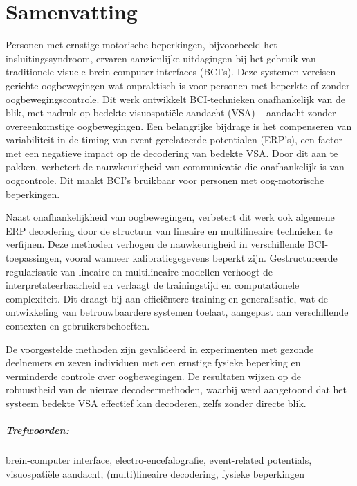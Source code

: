 \chapter*{Samenvatting}

Personen met ernstige motorische beperkingen, bijvoorbeeld het
insluitings\-syndroom, ervaren aanzienlijke uitdagingen bij het gebruik van
traditionele visuele brein-computer interfaces (BCI's).
Deze systemen vereisen gerichte oogbewegingen wat onpraktisch is voor personen
met beperkte of zonder oogbewegingscontrole.
Dit werk ontwikkelt BCI-technieken onafhankelijk van de blik, met nadruk
op bedekte visuospati\"ele aandacht (VSA) -- aandacht zonder overeenkomstige oogbewegingen.
Een belangrijke bijdrage is het compenseren van variabiliteit in de
timing van event-gerelateerde potentialen (ERP's), een factor met een negatieve
impact op de decodering van bedekte VSA.
Door dit aan te pakken, verbetert de nauwkeurigheid van communicatie die
onafhankelijk is van oogcontrole.
Dit maakt BCI's bruikbaar voor personen met oog-motorische beperkingen.

Naast onafhankelijkheid van oogbewegingen, verbetert dit werk ook algemene
ERP decodering door de structuur van lineaire en multilineaire technieken te verfijnen.
Deze methoden verhogen de nauwkeurigheid in verschillende BCI-toepassingen,
vooral wanneer kalibratiegegevens beperkt zijn.
Ge\-struc\-tu\-reerde regularisatie van lineaire en
multilineaire modellen verhoogt de interpretateerbaarheid
en verlaagt de trainingstijd en computationele complexiteit.
Dit draagt bij aan efficiëntere training en generalisatie, wat
de ont\-wik\-ke\-ling van betrouwbaardere systemen toelaat, aangepast aan
verschillende contexten en gebruikersbehoeften.

De voorgestelde methoden zijn gevalideerd in experimenten met gezonde
deelnemers en zeven individuen met een ernstige fysieke beperking en verminderde
controle over oogbewegingen.
De resultaten wijzen op de robuust\-heid van de nieuwe decodeermethoden,
waarbij werd aangetoond dat het systeem bedekte VSA effectief kan decoderen,
zelfs zonder directe blik.

\bigskip

\paragraph{Trefwoorden:}
brein-computer interface,
electro-encefalografie,
event-re\-la\-ted potentials,
visuospati\"ele aandacht,
(multi)lineaire decodering,
fysieke be\-per\-king\-en

